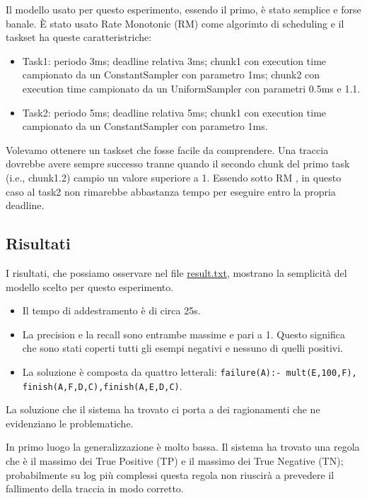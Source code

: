 \myskip

Il modello usato per questo esperimento, essendo il primo, è stato semplice e forse banale. È stato usato Rate Monotonic (RM) come algorimto di scheduling e il taskset ha queste caratteristriche:
\begin{itemize}
    \item Task1: periodo 3ms; deadline relativa 3ms; chunk1 con execution time campionato da un ConstantSampler con parametro 1ms; chunk2 con execution time campionato da un UniformSampler con parametri 0.5ms e 1.1.
    \item Task2: periodo 5ms; deadline relativa 5ms; chunk1 con execution time campionato da un ConstantSampler con parametro 1ms.
\end{itemize}

Volevamo ottenere un taskset che fosse facile da comprendere. Una traccia dovrebbe avere sempre successo tranne quando il secondo chunk del primo task (i.e., chunk1.2) campio un valore superiore a 1. Essendo sotto RM , in questo caso al task2 non rimarebbe abbastanza tempo per eseguire entro la propria deadline.

\subsection{Risultati}
I risultati, che possiamo osservare nel file \href{https://github.com/edoardosarri24/numsynth/tree/main/my-experiments/1-start/result.txt}{result.txt}, mostrano la semplicità del modello scelto per questo esperimento.
\begin{itemize}
    \item Il tempo di addestramento è di circa 25s.
    \item La precision e la recall sono entrambe massime e pari a 1. Questo significa che sono stati coperti tutti gli esempi negativi e nessuno di quelli positivi.
    \item La soluzione è composta da quattro letterali: \texttt{failure(A):- mult(E,100,F), \allowbreak finish(A,F,D,C),finish(A,E,D,C)}.
\end{itemize}

\myskip

La soluzione che il sistema ha trovato ci porta a dei ragionamenti che ne evidenziano le problematiche.

In primo luogo la generalizzazione è molto bassa. Il sistema ha trovato una regola che è il massimo dei True Positive (TP) e il massimo dei True Negative (TN); probabilmente su log più complessi questa regola non riuscirà a prevedere il fallimento della traccia in modo corretto.

